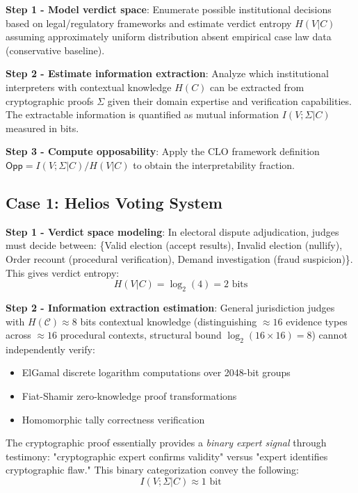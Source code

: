 \documentclass{ieeeaccess}
\begin{document}
\textbf{Step 1 - Model verdict space}: Enumerate possible institutional decisions based on legal/regulatory frameworks and estimate verdict entropy $H(V|{C})$ assuming approximately uniform distribution absent empirical case law data (conservative baseline).

\textbf{Step 2 - Estimate information extraction}: Analyze which institutional interpreters with contextual knowledge $H({C})$ can be extracted from cryptographic proofs $\Sigma$ given their domain expertise and verification capabilities. The extractable information is quantified  as mutual information $I(V;\Sigma|C)$ measured in bits.

\textbf{Step 3 - Compute opposability}: Apply the CLO framework definition $\mathsf{Opp} = I(V;\Sigma|C)/H(V|C)$ to obtain the interpretability fraction.

\subsection{Case 1: Helios Voting System}\label{app:helios}

\textbf{Step 1 - Verdict space modeling}: In electoral dispute adjudication, judges must decide between: \{Valid election (accept results), Invalid election (nullify), Order recount (procedural verification), Demand investigation (fraud suspicion)\}. This gives verdict entropy:
\begin{equation}
H(V|C) = \log_2(4) = 2 \text{ bits}
\end{equation}

\textbf{Step 2 - Information extraction estimation}: General jurisdiction judges with $H(\mathcal{C}) \approx 8$ bits contextual knowledge (distinguishing $\approx 16$ evidence types across $\approx 16$ procedural contexts, structural bound $\log_2(16 \times 16) = 8$) cannot independently verify:
\begin{itemize}
\item ElGamal discrete logarithm computations over 2048-bit groups
\item Fiat-Shamir zero-knowledge proof transformations
\item Homomorphic tally correctness verification
\end{itemize}

The cryptographic proof essentially provides a \emph{binary expert signal} through testimony: "cryptographic expert confirms validity" versus "expert identifies cryptographic flaw." This binary categorization convey the following:
\begin{equation}
I(V;\Sigma|C) \approx 1 \text{ bit}
\end{equation}
\end{document}
